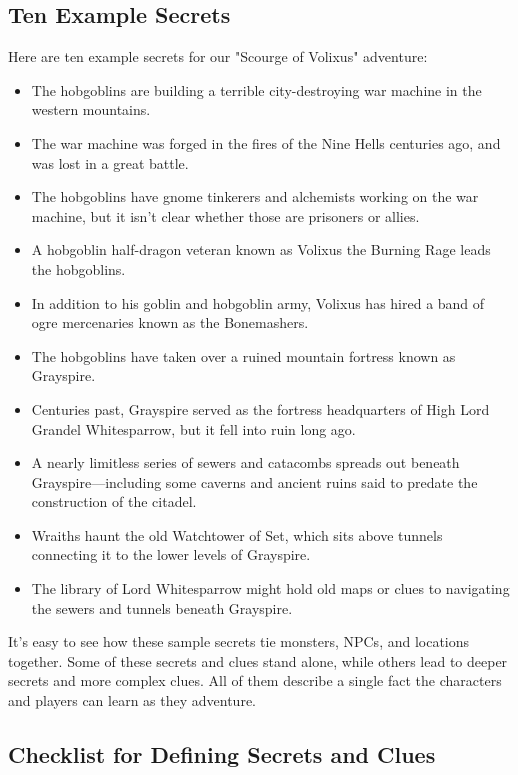 \documentclass[10pt,a4paper,twoside,bg=print,twocolumn,openany,nodeprecatedcode]{dndbook}
\begin{document}
\subsection{Ten Example Secrets}
Here are ten example secrets for our "Scourge of Volixus" adventure:

\begin{itemize}
\item The hobgoblins are building a terrible city-destroying war machine in the western mountains.
\item The war machine was forged in the fires of the Nine Hells centuries ago, and was lost in a great battle.
\item The hobgoblins have gnome tinkerers and alchemists working on the war machine, but it isn't clear whether those are prisoners or allies.
\item A hobgoblin half-dragon veteran known as Volixus the Burning Rage leads the hobgoblins.
\item In addition to his goblin and hobgoblin army, Volixus has hired a band of ogre mercenaries known as the Bonemashers.
\item The hobgoblins have taken over a ruined mountain fortress known as Grayspire.
\item Centuries past, Grayspire served as the fortress headquarters of High Lord Grandel Whitesparrow, but it fell into ruin long ago.
\item A nearly limitless series of sewers and catacombs spreads out beneath Grayspire—including some caverns and ancient ruins said to predate the construction of the citadel.
\item Wraiths haunt the old Watchtower of Set, which sits above tunnels connecting it to the lower levels of Grayspire.
\item The library of Lord Whitesparrow might hold old maps or clues to navigating the sewers and tunnels beneath Grayspire.
\end{itemize}

It's easy to see how these sample secrets tie monsters, NPCs, and locations together. Some of these secrets and clues stand alone, while others lead to deeper secrets and more complex clues. All of them describe a single fact the characters and players can learn as they adventure.
\subsection{Checklist for Defining Secrets and Clues}
\end{document}
